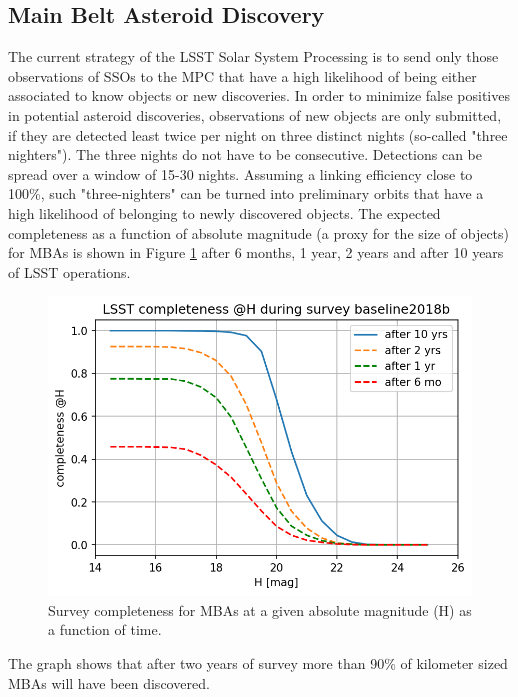 
\subsection{Main Belt Asteroid Discovery} \label{sec:disc}
The current strategy of the LSST Solar System Processing is to send only those observations of SSOs to the MPC that have a high likelihood of being either associated to know objects or new discoveries. 
In order to minimize false positives in potential asteroid discoveries, observations of new objects are only submitted, if they are detected least twice per night on three distinct nights (so-called "three nighters"). The three nights do not have to be consecutive. Detections can be spread over a window of 15-30 nights. Assuming a linking efficiency close to 100\%, such "three-nighters" can be turned into preliminary orbits that have a high likelihood of belonging to newly discovered objects. 
The expected completeness as a function of absolute magnitude (a proxy for the size of objects) for MBAs is shown in Figure \ref{fig:mba_compl} after 6 months, 1 year, 2 years and after 10 years of LSST operations.
\begin{figure}[b!]
\begin{center}
\includegraphics[scale=0.7]{figs/mba_completeness3.png}
\end{center}
\caption{Survey completeness for MBAs at a given absolute magnitude (H) as a function of time.}
\label{fig:mba_compl}       %
\end{figure}
%
The graph shows that after two years of survey more than 90\% of kilometer sized MBAs will have been discovered.
